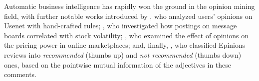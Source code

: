 Automatic business intelligence has rapidly won the ground in the
opinion mining field, with further notable works introduced by
\citet{Glance:05}, who analyzed users' opinions on Usenet with
hand-crafted rules; \citet{Antweiler:04}, who investigated how
postings on message boards correlated with stock volatility;
\citet{Ghose:07}, who examined the effect of opinions on the pricing
power in online marketplaces; and, finally, \citet{Turney:02}, who
classified Epinions reviews into \emph{recommended} (thumbs up) and
\emph{not recommended} (thumbs down) ones, based on the pointwise
mutual information of the adjectives in these comments.



